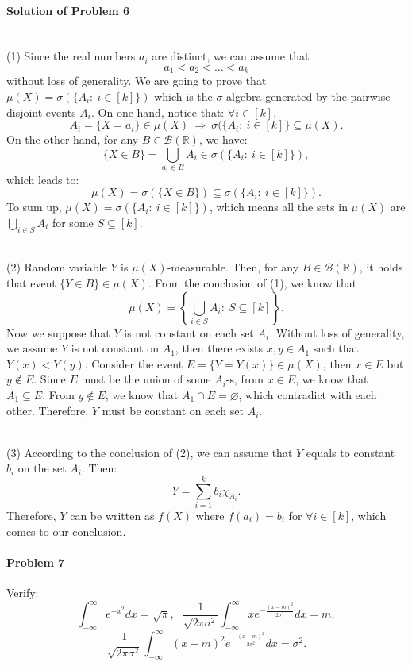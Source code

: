 \documentclass{article}
\begin{document}
\paragraph{Solution of Problem 6}~\\
(1) Since the real numbers $a_i$ are distinct, we can assume that
\[a_1<a_2<\ldots<a_k\]
without loss of generality. We are going to prove that $\mu(X)=\sigma(\{A_i:~i\in[k]\})$ which is the $\sigma$-algebra generated by the pairwise disjoint events $A_i$. On one hand, notice that: $\forall i\in[k]$,
\[A_i=\{X=a_i\}\in\mu(X)~\Rightarrow~\sigma(\{A_i:~i\in[k]\}\subseteq \mu(X).\]
On the other hand, for any $B\in\mathcal B(\mathbb{R})$, we have:
\[\{X\in B\}=\bigcup_{a_i\in B}A_i \in\sigma(\{A_i:~i\in[k]\}),\]
which leads to:
\[\mu(X)=\sigma\left(\{X\in B\}\right)\subseteq \sigma(\{A_i:~i\in[k]\}).\]
To sum up, $\mu(X)=\sigma(\{A_i:~i\in[k]\})$, which means all the sets in $\mu(X)$ are $\bigcup_{i\in S}A_i$ for some $S\subseteq [k]$. 

~\\
(2) Random variable $Y$ is $\mu(X)$-measurable. Then, for any $B\in\mathcal B(\mathbb{R})$, it holds that event $\{Y\in B\}\in\mu(X)$. From the conclusion of (1), we know that 
\[\mu(X)=\left\{\bigcup_{i\in S}A_i:~S\subseteq [k]\right\}.\]
Now we suppose that $Y$ is not constant on each set $A_i$. Without loss of generality, we assume $Y$ is not constant on $A_1$, then there exists $x,y\in A_1$ such that $Y(x)<Y(y)$. Consider the event $E = \{Y=Y(x)\}\in\mu(X)$, then $x\in E$ but $y\notin E$. Since $E$ must be the union of some $A_i$-s, from $x\in E$, we know that $A_1\subseteq E$. From $y\notin E$, we know that $A_1\cap E=\varnothing$, which contradict with each other. Therefore, $Y$ must be constant on each set $A_i$.

~\\
(3) According to the conclusion of (2), we can assume that $Y$ equals to constant $b_i$ on the set $A_i$. Then:
\[Y=\sum_{i=1}^{k}b_i\chi_{A_i}.\]
Therefore, $Y$ can be written as $f(X)$ where $f(a_i)=b_i$ for $\forall i\in[k]$, which comes to our conclusion. 


\paragraph{Problem 7} Verify:
\[\int_{-\infty}^{\infty}e^{-x^2}dx=\sqrt{\pi},~~~\frac{1}{\sqrt{2\pi\sigma^2}}\int_{-\infty}^{\infty}xe^{-\frac{(x-m)^2}{2\sigma^2}}dx=m,\]
\[\frac{1}{\sqrt{2\pi\sigma^2}}\int_{-\infty}^{\infty}(x-m)^2e^{-\frac{(x-m)^2}{2\sigma^2}}dx=\sigma^2.\]
\end{document}
